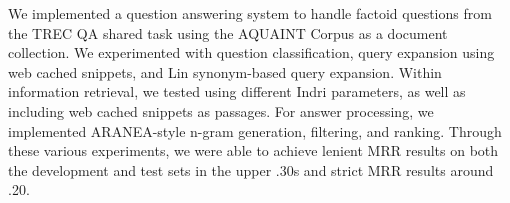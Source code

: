 \documentclass[11pt]{article}
\begin{document}
We implemented a question answering system to handle factoid questions from the TREC QA shared task using the AQUAINT Corpus as a document collection.  We experimented with question classification, query expansion using web cached snippets, and Lin synonym-based query expansion.  Within information retrieval, we tested using different Indri parameters, as well as including web cached snippets as passages.  For answer processing, we implemented ARANEA-style n-gram generation, filtering, and ranking.  Through these various experiments, we were able to achieve lenient MRR results on both the development and test sets in the upper .30s and strict MRR results around .20.

\nocite{*}




\end{document}
